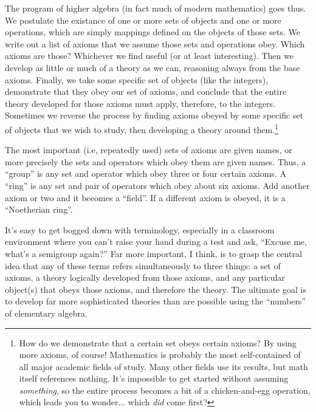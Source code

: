 The program of higher algebra (in fact much of modern mathematics)
goes thus.  We postulate the existance of one or more sets of objects
and one or more operations, which are simply mappings defined on the
objects of those sets.  We write out a list of axioms that we assume
those sets and operations obey.  Which axioms are those?  Whichever we
find useful (or at least interesting).  Then we develop as little or
much of a theory as we can, reasoning always from the base axioms.
Finally, we take some specific set of objects (like the integers),
demonstrate that they obey our set of axioms, and conclude that the
entire theory developed for those axioms must apply, therefore, to the
integers.  Sometimes we reverse the process by finding axioms obeyed
by some specific set of objects that we wish to study, then developing
a theory around them.\footnote{How do we demonstrate that a certain
set obeys certain axioms?  By using more axioms, of course!
Mathematics is probably the most self-contained of all major academic
fields of study.  Many other fields use its results, but math itself
references nothing.  It's impossible to get started without assuming
{\it something}, so the entire process becomes a bit of a
chicken-and-egg operation, which leads you to wonder$...$ which {\it
did} come first?}

The most important (i.e, repeatedly used) sets of axioms are given
names, or more precisely the sets and operators which obey them are
given names.  Thus, a ``group'' is any set and operator which obey three
or four certain axioms.  A ``ring'' is any set and pair of operators
which obey about six axioms.  Add another axiom or two and it
becomes a ``field''.  If a different axiom is obeyed, it is a
``Noetherian ring''.

It's easy to get bogged down with terminology, especially in a
classroom environment where you can't raise your hand during a test
and ask, ``Excuse me, what's a semigroup again?''  Far more important,
I think, is to grasp the central idea that any of these terms refers
simultaneously to three things: a set of axioms, a theory logically
developed from those axioms, and any particular object(s) that obeys
those axioms, and therefore the theory.  The ultimate goal is to
develop far more sophisticated theories than are possible using the
``numbers'' of elementary algebra.

